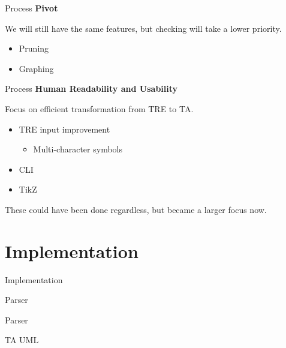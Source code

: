 \documentclass{beamer}
\begin{document}
\begin{frame}{Process}
    \textbf{Pivot}

    We will still have the same features, but checking will take a lower priority.
    \newline
    \begin{itemize}
        \item Pruning
        \item Graphing
    \end{itemize}
\end{frame}

\begin{frame}{Process}
    \textbf{Human Readability and Usability}

    Focus on efficient transformation from TRE to TA.
    \newline
    \begin{itemize}
        \item TRE input improvement
        \begin{itemize}
            \item Multi-character symbols
        \end{itemize}
        \item CLI
        \item TikZ
    \end{itemize}

    These could have been done regardless, but became a larger focus now.
\end{frame}

\section{Implementation}

\begin{frame}{Implementation}
\end{frame}

\begin{frame}[shrink=20]{Parser}
    
\end{frame}

\begin{frame}{Parser}
    
\end{frame}

\begin{frame}{TA UML}
    
\end{frame}


\end{document}
